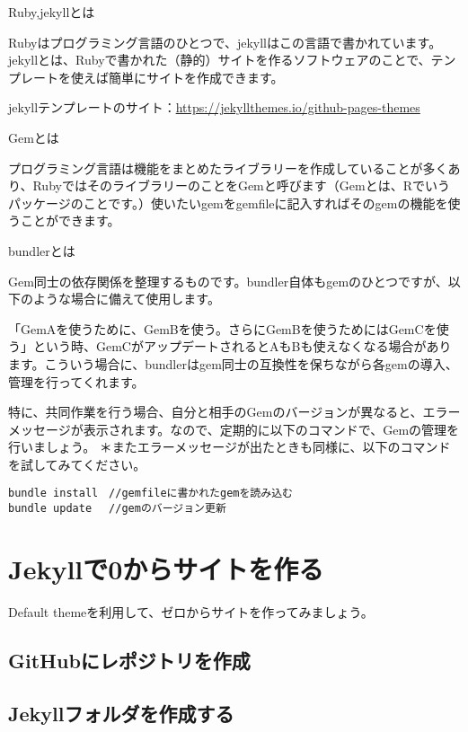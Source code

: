 \documentclass[
]{book}
\begin{document}
Ruby,jekyllとは

Rubyはプログラミング言語のひとつで、jekyllはこの言語で書かれています。jekyllとは、Rubyで書かれた（静的）サイトを作るソフトウェアのことで、テンプレートを使えば簡単にサイトを作成できます。

jekyllテンプレートのサイト：\url{https://jekyllthemes.io/github-pages-themes}

Gemとは

プログラミング言語は機能をまとめたライブラリーを作成していることが多くあり、RubyではそのライブラリーのことをGemと呼びます（Gemとは、Rでいうパッケージのことです。）使いたいgemをgemfileに記入すればそのgemの機能を使うことができます。

bundlerとは

Gem同士の依存関係を整理するものです。bundler自体もgemのひとつですが、以下のような場合に備えて使用します。

「GemAを使うために、GemBを使う。さらにGemBを使うためにはGemCを使う」という時、GemCがアップデートされるとAもBも使えなくなる場合があります。こういう場合に、bundlerはgem同士の互換性を保ちながら各gemの導入、管理を行ってくれます。

特に、共同作業を行う場合、自分と相手のGemのバージョンが異なると、エラーメッセージが表示されます。なので、定期的に以下のコマンドで、Gemの管理を行いましょう。
＊またエラーメッセージが出たときも同様に、以下のコマンドを試してみてください。

\begin{verbatim}
bundle install　//gemfileに書かれたgemを読み込む
bundle update 　//gemのバージョン更新
\end{verbatim}

\hypertarget{jekyllux30670ux304bux3089ux30b5ux30a4ux30c8ux3092ux4f5cux308b}{%
\chapter{Jekyllで0からサイトを作る}\label{jekyllux30670ux304bux3089ux30b5ux30a4ux30c8ux3092ux4f5cux308b}}

Default themeを利用して、ゼロからサイトを作ってみましょう。

\hypertarget{githubux306bux30ecux30ddux30b8ux30c8ux30eaux3092ux4f5cux6210}{%
\section{GitHubにレポジトリを作成}\label{githubux306bux30ecux30ddux30b8ux30c8ux30eaux3092ux4f5cux6210}}

\hypertarget{jekyllux30d5ux30a9ux30ebux30c0ux3092ux4f5cux6210ux3059ux308b}{%
\section{Jekyllフォルダを作成する}\label{jekyllux30d5ux30a9ux30ebux30c0ux3092ux4f5cux6210ux3059ux308b}}
\end{document}
